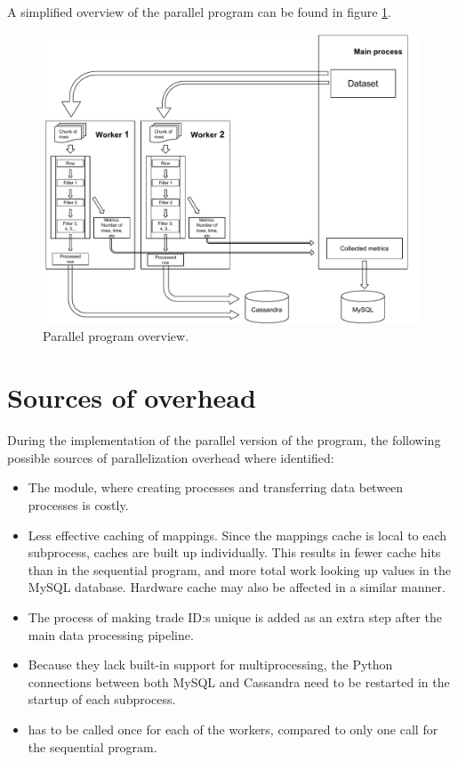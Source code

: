 A simplified overview of the parallel program can be found in figure \ref{fig:parallel_program_overview}.

\begin{figure}
  \centering
  \includegraphics[width=200mm]{figures/program_overview.pdf}
  \caption[Parallel program overview.]{Parallel program overview.}
  \label{fig:parallel_program_overview}
\end{figure}

\section{Sources of overhead}
During the implementation of the parallel version of the program, the following possible sources of parallelization overhead where identified:

\begin{itemize}
  \item The  module, where creating processes and transferring data between processes is costly.
  \item Less effective caching of mappings. Since the mappings cache is local to each subprocess, caches are built up individually. This results in fewer cache hits than in the sequential program, and more total work
    looking up values in the MySQL database. Hardware cache may also be affected in a similar manner.
  \item The process of making trade ID:s unique is added as an extra step after the main data processing pipeline.
  \item Because they lack built-in support for multiprocessing, the Python connections between both MySQL and Cassandra need to be restarted in the startup of each subprocess.
  \item {} has to be called once for each of the workers, compared to only one call for the sequential program.
\end{itemize}

